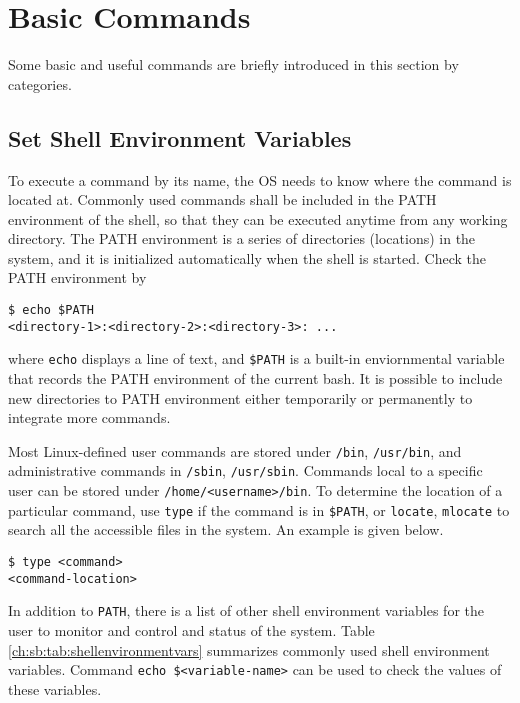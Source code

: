 \section{Basic Commands}

Some basic and useful commands are briefly introduced in this section by categories.

\subsection{Set Shell Environment Variables}\label{ch:sb:subsec:shellenvvar}

To execute a command by its name, the OS needs to know where the command is located at. Commonly used commands shall be included in the PATH environment of the shell, so that they can be executed anytime from any working directory. The PATH environment is a series of directories (locations) in the system, and it is initialized automatically when the shell is started. Check the PATH environment by
\begin{lstlisting}
$ echo $PATH
<directory-1>:<directory-2>:<directory-3>: ...
\end{lstlisting}
where \verb|echo| displays a line of text, and \verb|$PATH| is a built-in enviornmental variable that records the PATH environment of the current bash. It is possible to include new directories to PATH environment either temporarily or permanently to integrate more commands.

Most Linux-defined user commands are stored under \verb|/bin|, \verb|/usr/bin|, and administrative commands in \verb|/sbin|, \verb|/usr/sbin|. Commands local to a specific user can be stored under \verb|/home/<username>/bin|. To determine the location of a particular command, use \verb|type| if the command is in \verb|$PATH|, or \verb|locate|, \verb|mlocate| to search all the accessible files in the system. An example is given below.
\begin{lstlisting}
$ type <command>
<command-location>
\end{lstlisting}

In addition to \verb|PATH|, there is a list of other shell environment variables for the user to monitor and control and status of the system. Table \ref{ch:sb:tab:shellenvironmentvars} summarizes commonly used shell environment variables. Command \verb|echo $<variable-name>| can be used to check the values of these variables.


